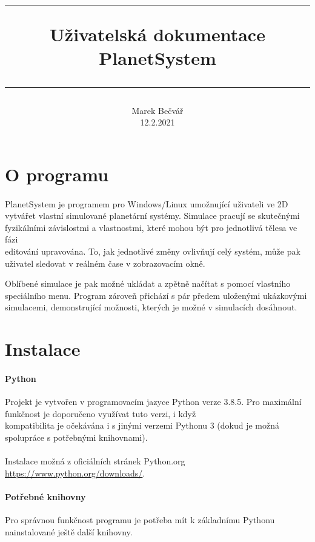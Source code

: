 \documentclass[a4paper, 12pt]{article}
\title{
        \vspace{1in}
        \rule{\linewidth}{0.5pt}
		\usefont{OT1}{bch}{b}{n}
        \huge Uživatelská dokumentace \\PlanetSystem\\
        \vspace{-10pt}
        \rule{\linewidth}{1pt}
}
\author{
		\normalfont\normalsize
        Marek Bečvář\\[-3pt]\normalsize
        12.2.2021
}
\date{}
\begin{document}
\maketitle 
\newpage

\tableofcontents
\newpage

\section{O programu} 
\paragraph{}
PlanetSystem je programem pro Windows/Linux umožnující uživateli ve 2D vytvářet vlastní
simulované planetární systémy. Simulace pracují se skutečnými fyzikálními
závislostmi a vlastnostmi, které mohou být pro jednotlivá tělesa ve fázi
\\editování upravována. To, jak jednotlivé změny ovlivňují celý systém, může pak
uživatel sledovat v reálném čase v zobrazovacím okně.

Oblíbené simulace je pak možné ukládat a zpětně načítat s pomocí vlastního
speciálního menu. Program zároveň přichází s pár předem uloženými ukázkovými
simulacemi, demonstrující možnosti, kterých je možné v simulacích dosáhnout. 

\section{Instalace}
\paragraph{Python}
Projekt je vytvořen v programovacím jazyce Python verze 3.8.5. Pro maximální
funkčnost je doporučeno využívat tuto verzi, i když \\kompatibilita je
očekávána i s jinými verzemi Pythonu 3 (dokud je možná spolupráce s potřebnými
knihovnami).\\\\ Instalace možná z oficiálních stránek Python.org
\url{https://www.python.org/downloads/}.

\paragraph{Potřebné knihovny} Pro správnou funkčnost programu je potřeba mít k
základnímu Pythonu nainstalované ještě další knihovny. 
\end{document}
